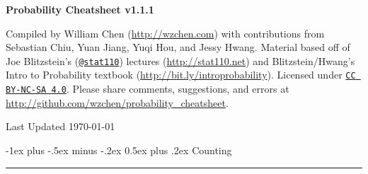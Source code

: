 \documentclass[10pt,landscape]{article}
\makeatletter
\renewcommand{\section}{\@startsection{section}{1}{0mm}%
                                {-1ex plus -.5ex minus -.2ex}%
                                {0.5ex plus .2ex}%
                                {\normalfont\large\bfseries}}
\renewcommand{\subsection}{\@startsection{subsection}{2}{0mm}%
                                {-1explus -.5ex minus -.2ex}%
                                {0.5ex plus .2ex}%
                                {\normalfont\normalsize\bfseries}}
\makeatother
\begin{document}
\raggedright
\footnotesize
\begin{multicols}{3}


\setlength{\premulticols}{1pt}
\setlength{\postmulticols}{1pt}
\setlength{\multicolsep}{1pt}
\setlength{\columnsep}{2pt}


\begin{center}
     \Large{\textbf{Probability Cheatsheet v1.1.1}} \\
\end{center}


\scriptsize

Compiled by William Chen (\url{http://wzchen.com}) with contributions from Sebastian Chiu, Yuan Jiang, Yuqi Hou, and Jessy Hwang. Material based off of Joe Blitzstein's (\texttt{\href{http://twitter.com/stat110}{@stat110}}) lectures (\url{http://stat110.net}) and Blitzstein/Hwang's Intro to Probability textbook (\url{http://bit.ly/introprobability}). Licensed under \texttt{\href{http://creativecommons.org/licenses/by-nc-sa/4.0/}{CC BY-NC-SA 4.0}}. Please share comments, suggestions, and errors at \url{http://github.com/wzchen/probability_cheatsheet}.

\begin{center}
    Last Updated \today
\end{center}




\section{Counting}\smallskip \hrule height 2pt \smallskip



\end{multicols}
\end{document}
